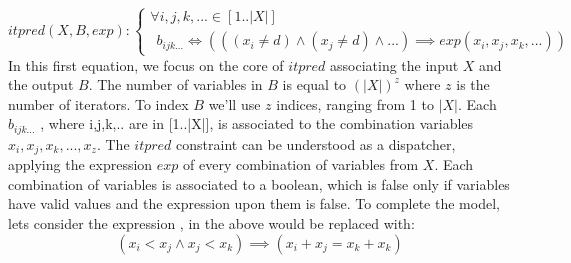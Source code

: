 \begin{equation}\label{csp:itpred}
    itpred(X,B,exp):
    \begin{cases}
        \forall i,j,k,... \in [1..|X|]\\
        ~~b_{ijk...} \iff (((x_i \neq d) \wedge (x_j \neq d) \wedge ...) \implies exp(x_i,x_j,x_k,...))
    \end{cases}
\end{equation}
In this first equation, we focus on the core of $itpred$ associating the input $X$ and the output $B$.
The number of variables in $B$ is equal to $(|X|)^z$ where $z$ is the number of iterators.
To index $B$ we'll use $z$ indices, ranging from 1 to $|X|$.
Each $b_{ijk...}$ , where i,j,k,.. are in [1..|X|], is associated to the combination variables $x_i,x_j,x_k,...,x_z$.
The $itpred$ constraint can be understood as a dispatcher, applying the expression $exp$ of every combination of variables from $X$.
Each combination of variables is associated to a boolean, which is false only if variables have valid values and the expression upon them is false.
To complete the model, lets consider the expression ,  in the above would be replaced with:
$$(x_i<x_j \wedge x_j < x_k) \implies (x_i+x_j=x_k+x_k)$$



